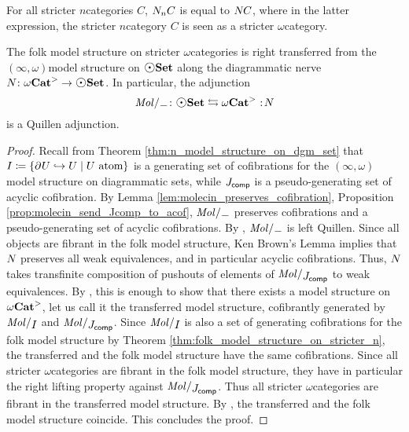 \begin{rmk}
    For all stricter \( n \)\nbd categories \( C \), \( N_{n} C \) is equal to \( N_{} C \), where in the latter expression, the stricter \( n \)\nbd category \( C \) is seen as a stricter \( \omega \)\nbd category.
\end{rmk}


\begin{prop} \label{prop:quillen_folk_dgm_infty}
    The folk model structure on stricter \( \omega \)\nbd categories is right transferred from the \( (\infty, \omega) \)\nbd model structure on \( \dgmSet \) along the diagrammatic nerve \( \N{} \colon \somegaCat \to \dgmSet \).
    In particular, the adjunction 
    \begin{equation*}
        \molecin{-} \colon \dgmSet \leftrightarrows \somegaCat \cocolon \N{}
    \end{equation*}
    is a Quillen adjunction.
\end{prop}
\begin{proof}
    Recall from Theorem \ref{thm:n_model_structure_on_dgm_set} that \( I \coloneqq \left\{ {\partial_{}^{} U \hookrightarrow U \mid U \text{ atom}} \right\} \) is a generating set of cofibrations for the \( (\infty, \omega) \)\nbd model structure on diagrammatic sets, while \( J_{\mathsf{comp}} \) is a pseudo-generating set of acyclic cofibration. 
    By Lemma \ref{lem:molecin_preserves_cofibration}, Proposition \ref{prop:molecin_send_Jcomp_to_acof}, \( \molecin{-} \) preserves cofibrations and a pseudo-generating set of acyclic cofibrations.
    By \cite[E.2.14]{joyal2008theory}, \( \molecin{-} \) is left Quillen. 
    Since all objects are fibrant in the folk model structure, Ken Brown's Lemma implies that \( N_{} \) preserves all weak equivalences, and in particular acyclic cofibrations. 
    Thus, \( N_{} \) takes transfinite composition of pushouts of elements of \( \molecin{\Jcomp} \) to weak equivalences.
    By \cite[Theorem 11.3.2]{hirschhorn2003model}, this is enough to show that there exists a model structure on \( {\omega\mathbf{Cat}}^> \), let us call it the transferred model structure, cofibrantly generated by \( \molecin{I} \) and \( \molecin{\Jcomp} \).
    Since \( \molecin{I} \) is also a set of generating cofibrations for the folk model structure by Theorem \ref{thm:folk_model_structure_on_stricter_n}, the transferred and the folk model structure have the same cofibrations.
    Since all stricter \( \omega \)\nbd categories are fibrant in the folk model structure, they have in particular the right lifting property against \( \molecin{\Jcomp} \).
    Thus all stricter \( \omega \)\nbd categories are fibrant in the transferred model structure.
    By \cite[Proposition E.1.10]{joyal2008theory}, the transferred and the folk model structure coincide.
    This concludes the proof.
\end{proof}

